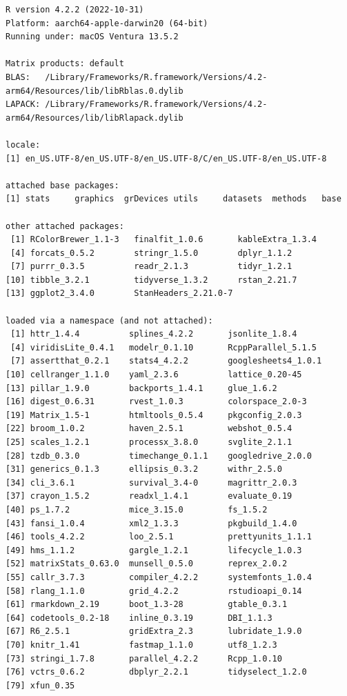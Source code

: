 \documentclass[
  letterpaper,
  DIV=11,
  numbers=noendperiod]{scrartcl}
\begin{document}
\begin{verbatim}
R version 4.2.2 (2022-10-31)
Platform: aarch64-apple-darwin20 (64-bit)
Running under: macOS Ventura 13.5.2

Matrix products: default
BLAS:   /Library/Frameworks/R.framework/Versions/4.2-arm64/Resources/lib/libRblas.0.dylib
LAPACK: /Library/Frameworks/R.framework/Versions/4.2-arm64/Resources/lib/libRlapack.dylib

locale:
[1] en_US.UTF-8/en_US.UTF-8/en_US.UTF-8/C/en_US.UTF-8/en_US.UTF-8

attached base packages:
[1] stats     graphics  grDevices utils     datasets  methods   base     

other attached packages:
 [1] RColorBrewer_1.1-3   finalfit_1.0.6       kableExtra_1.3.4    
 [4] forcats_0.5.2        stringr_1.5.0        dplyr_1.1.2         
 [7] purrr_0.3.5          readr_2.1.3          tidyr_1.2.1         
[10] tibble_3.2.1         tidyverse_1.3.2      rstan_2.21.7        
[13] ggplot2_3.4.0        StanHeaders_2.21.0-7

loaded via a namespace (and not attached):
 [1] httr_1.4.4          splines_4.2.2       jsonlite_1.8.4     
 [4] viridisLite_0.4.1   modelr_0.1.10       RcppParallel_5.1.5 
 [7] assertthat_0.2.1    stats4_4.2.2        googlesheets4_1.0.1
[10] cellranger_1.1.0    yaml_2.3.6          lattice_0.20-45    
[13] pillar_1.9.0        backports_1.4.1     glue_1.6.2         
[16] digest_0.6.31       rvest_1.0.3         colorspace_2.0-3   
[19] Matrix_1.5-1        htmltools_0.5.4     pkgconfig_2.0.3    
[22] broom_1.0.2         haven_2.5.1         webshot_0.5.4      
[25] scales_1.2.1        processx_3.8.0      svglite_2.1.1      
[28] tzdb_0.3.0          timechange_0.1.1    googledrive_2.0.0  
[31] generics_0.1.3      ellipsis_0.3.2      withr_2.5.0        
[34] cli_3.6.1           survival_3.4-0      magrittr_2.0.3     
[37] crayon_1.5.2        readxl_1.4.1        evaluate_0.19      
[40] ps_1.7.2            mice_3.15.0         fs_1.5.2           
[43] fansi_1.0.4         xml2_1.3.3          pkgbuild_1.4.0     
[46] tools_4.2.2         loo_2.5.1           prettyunits_1.1.1  
[49] hms_1.1.2           gargle_1.2.1        lifecycle_1.0.3    
[52] matrixStats_0.63.0  munsell_0.5.0       reprex_2.0.2       
[55] callr_3.7.3         compiler_4.2.2      systemfonts_1.0.4  
[58] rlang_1.1.0         grid_4.2.2          rstudioapi_0.14    
[61] rmarkdown_2.19      boot_1.3-28         gtable_0.3.1       
[64] codetools_0.2-18    inline_0.3.19       DBI_1.1.3          
[67] R6_2.5.1            gridExtra_2.3       lubridate_1.9.0    
[70] knitr_1.41          fastmap_1.1.0       utf8_1.2.3         
[73] stringi_1.7.8       parallel_4.2.2      Rcpp_1.0.10        
[76] vctrs_0.6.2         dbplyr_2.2.1        tidyselect_1.2.0   
[79] xfun_0.35          
\end{verbatim}
\end{document}

